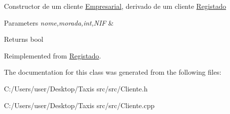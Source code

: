 Constructor de um cliente \hyperlink{class_empresarial}{Empresarial}, derivado de um cliente \hyperlink{class_registado}{Registado}


\begin{DoxyParams}{Parameters}
{\em nome,morada,int,N\+IF} & \\
\hline
\end{DoxyParams}
\begin{DoxyReturn}{Returns}
bool 
\end{DoxyReturn}


Reimplemented from \hyperlink{class_registado}{Registado}.



The documentation for this class was generated from the following files\+:\begin{DoxyCompactItemize}
\item 
C\+:/\+Users/user/\+Desktop/\+Taxis src/src/Cliente.\+h\item 
C\+:/\+Users/user/\+Desktop/\+Taxis src/src/Cliente.\+cpp\end{DoxyCompactItemize}
